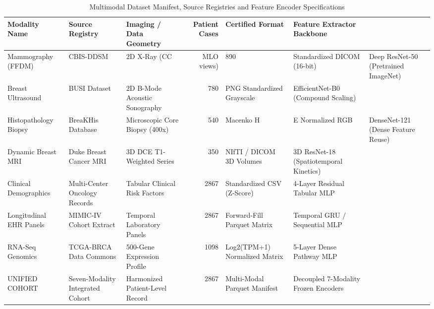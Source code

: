 \begin{table}
\caption{Multimodal Dataset Manifest, Source Registries and Feature Encoder Specifications}
\label{tab:table_6_01_04_multimodal_dataset_manifest_and_cohort_demographics}
\begin{tabular}{lllrll}
\toprule
Modality Name & Source Registry & Imaging / Data Geometry & Patient Cases & Certified Format & Feature Extractor Backbone \\
\midrule
Mammography (FFDM) & CBIS-DDSM & 2D X-Ray (CC & MLO views) & 890 & Standardized DICOM (16-bit) & Deep ResNet-50 (Pretrained ImageNet) \\
Breast Ultrasound & BUSI Dataset & 2D B-Mode Acoustic Sonography & 780 & PNG Standardized Grayscale & EfficientNet-B0 (Compound Scaling) \\
Histopathology Biopsy & BreaKHis Database & Microscopic Core Biopsy (400x) & 540 & Macenko H&E Normalized RGB & DenseNet-121 (Dense Feature Reuse) \\
Dynamic Breast MRI & Duke Breast Cancer MRI & 3D DCE T1-Weighted Series & 350 & NIfTI / DICOM 3D Volumes & 3D ResNet-18 (Spatiotemporal Kinetics) \\
Clinical Demographics & Multi-Center Oncology Records & Tabular Clinical Risk Factors & 2867 & Standardized CSV (Z-Score) & 4-Layer Residual Tabular MLP \\
Longitudinal EHR Panels & MIMIC-IV Cohort Extract & Temporal Laboratory Panels & 2867 & Forward-Fill Parquet Matrix & Temporal GRU / Sequential MLP \\
RNA-Seq Genomics & TCGA-BRCA Data Commons & 500-Gene Expression Profile & 1098 & Log2(TPM+1) Normalized Matrix & 5-Layer Dense Pathway MLP \\
UNIFIED COHORT & Seven-Modality Integrated Cohort & Harmonized Patient-Level Record & 2867 & Multi-Modal Parquet Manifest & Decoupled 7-Modality Frozen Encoders \\
\bottomrule
\end{tabular}
\end{table}

